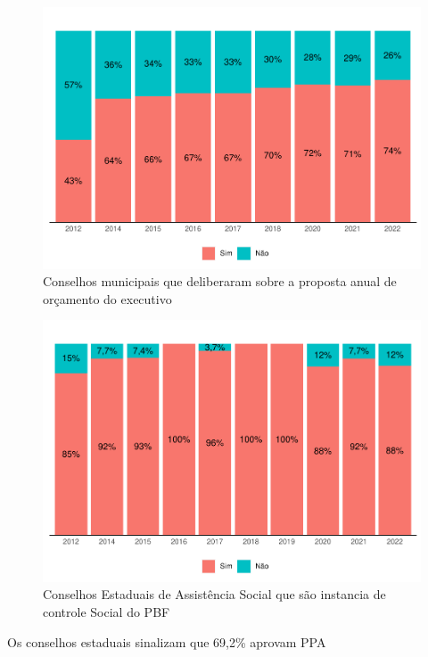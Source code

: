 \documentclass[
  brazilian]{report}
\begin{document}
\begin{figure}
\includegraphics{Censo-SUAS-2022_files/figure-latex/cmas-ppa-1} \caption[Conselhos municipais que deliberaram sobre a proposta anual de orçamento do executivo]{Conselhos municipais que deliberaram sobre a proposta anual de orçamento do executivo}\label{fig:cmas-ppa}
\end{figure}

\begin{figure}
\includegraphics{Censo-SUAS-2022_files/figure-latex/ceas_icspbf2-1} \caption[Conselhos Estaduais de Assistência Social que são instancia de controle Social do PBF]{Conselhos Estaduais de Assistência Social que são instancia de controle Social do PBF}\label{fig:ceas_icspbf2}
\end{figure}

Os conselhos estaduais sinalizam que 69,2\% aprovam PPA
\end{document}
